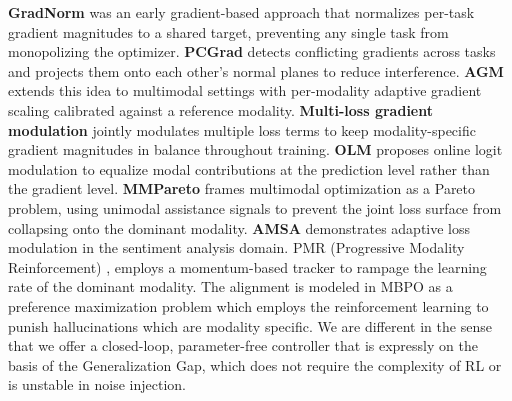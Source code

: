 \documentclass{ieeeaccess}
\begin{document}
\textbf{GradNorm} \cite{chen2018gradnorm} was an early gradient-based approach that normalizes per-task gradient magnitudes to a shared target, preventing any single task from monopolizing the optimizer. \textbf{PCGrad} \cite{yu2020gradient} detects conflicting gradients across tasks and projects them onto each other's normal planes to reduce interference. \textbf{AGM} \cite{li2023boosting} extends this idea to multimodal settings with per-modality adaptive gradient scaling calibrated against a reference modality. \textbf{Multi-loss gradient modulation} \cite{kontras2024improving} jointly modulates multiple loss terms to keep modality-specific gradient magnitudes in balance throughout training. \textbf{OLM} \cite{zong2024balancing} proposes online logit modulation to equalize modal contributions at the prediction level rather than the gradient level. \textbf{MMPareto} \cite{wei2024mmpareto} frames multimodal optimization as a Pareto problem, using unimodal assistance signals to prevent the joint loss surface from collapsing onto the dominant modality. \textbf{AMSA} \cite{wang2023amsa} demonstrates adaptive loss modulation in the sentiment analysis domain. PMR (Progressive Modality Reinforcement) \cite{xu2025balancebenchmark}, employs a momentum-based tracker to rampage the learning rate of the dominant modality. The alignment is modeled in MBPO \cite{liu2025modality} as a preference maximization problem which employs the reinforcement learning to punish hallucinations which are modality specific. We are different in the sense that we offer a closed-loop, parameter-free controller that is expressly on the basis of the Generalization Gap, which does not require the complexity of RL or is unstable in noise injection.


\begin{table}[h]
\caption{\textbf{Comparison of Multimodal Imbalance Mitigation Strategies.} Paper's method combines the dynamic adaptability of OGM-GE with the low computational footprint required for modern large-scale pre-training.}
\label{tab:relwork}
\centering
{}

\end{table}
\end{document}
